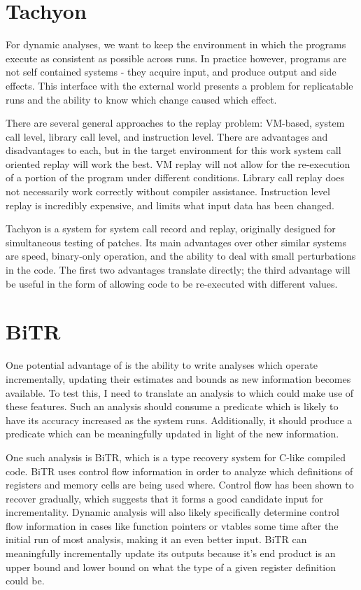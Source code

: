 \section{Tachyon}
For dynamic analyses, we want to keep the environment in which the programs execute as consistent as possible across runs.
In practice however, programs are not self contained systems - they acquire input, and produce output and side effects.
This interface with the external world presents a problem for replicatable runs and the ability to know which change caused which effect.

There are several general approaches to the replay problem: VM-based, system call level, library call level, and instruction level.
There are advantages and disadvantages to each, but in the target environment for this work system call oriented replay will work the best.
VM replay will not allow for the re-execution of a portion of the program under different conditions.
Library call replay does not necessarily work correctly without compiler assistance.
Instruction level replay is incredibly expensive, and limits what input data has been changed.

Tachyon is a system for system call record and replay, originally designed for simultaneous testing of patches.
Its main advantages over other similar systems are speed, binary-only operation, and the ability to deal with small perturbations in the code.
The first two advantages translate directly;
the third advantage will be useful in the form of allowing code to be re-executed with different values.

\section{BiTR}
One potential advantage of \sysname is the ability to write analyses which operate incrementally, updating their estimates and bounds as new information becomes available.
To test this, I need to translate an analysis to \sysname which could make use of these features.
Such an analysis should consume a predicate which is likely to have its accuracy increased as the system runs.
Additionally, it should produce a predicate which can be meaningfully updated in light of the new information.

One such analysis is BiTR, which is a type recovery system for C-like compiled code.
BiTR uses control flow information in order to analyze which definitions of registers and memory cells are being used where.
Control flow has been shown to recover gradually, which suggests that it forms a good candidate input for incrementality.
Dynamic analysis will also likely specifically determine control flow information in cases like function pointers or vtables some time after the initial run of most analysis, making it an even better input.
BiTR can meaningfully incrementally update its outputs because it's end product is an upper bound and lower bound on what the type of a given register definition could be.

